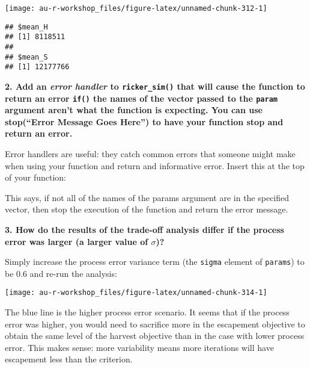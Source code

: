 \documentclass[]{book}
\newenvironment{Shaded}{\begin{snugshade}}{\end{snugshade}}
\newcommand{\KeywordTok}[1]{\textcolor[rgb]{0.13,0.29,0.53}{\textbf{#1}}}
\newcommand{\StringTok}[1]{\textcolor[rgb]{0.31,0.60,0.02}{#1}}
\newcommand{\ControlFlowTok}[1]{\textcolor[rgb]{0.13,0.29,0.53}{\textbf{#1}}}
\newcommand{\OperatorTok}[1]{\textcolor[rgb]{0.81,0.36,0.00}{\textbf{#1}}}
\newcommand{\NormalTok}[1]{#1}
\theoremstyle{definition}
\theoremstyle{definition}
\theoremstyle{definition}
\theoremstyle{remark}
\begin{document}
\begin{center}\texttt{[image: au-r-workshop\_files/figure-latex/unnamed-chunk-312-1]} \end{center}

\begin{verbatim}
## $mean_H
## [1] 8118511
## 
## $mean_S
## [1] 12177766
\end{verbatim}

\textbf{2. Add an \emph{error handler} to \texttt{ricker\_sim()} that
will cause the function to return an error \texttt{if()} the names of
the vector passed to the \texttt{param} argument aren't what the
function is expecting. You can use stop(``Error Message Goes Here'') to
have your function stop and return an error.}

Error handlers are useful: they catch common errors that someone might
make when using your function and return and informative error. Insert
this at the top of your function:

\begin{Shaded}
\end{Shaded}

This says, if not all of the names of the params argument are in the
specified vector, then stop the execution of the function and return the
error message.

\textbf{3. How do the results of the trade-off analysis differ if the
process error was larger (a larger value of \(\sigma\))?}

Simply increase the process error variance term (the \texttt{sigma}
element of \texttt{params}) to be 0.6 and re-run the analysis:

\begin{center}\texttt{[image: au-r-workshop\_files/figure-latex/unnamed-chunk-314-1]} \end{center}

The blue line is the higher process error scenario. It seems that if the
process error was higher, you would need to sacrifice more in the
escapement objective to obtain the same level of the harvest objective
than in the case with lower process error. This makes sense: more
variability means more iterations will have escapement less than the
criterion.
\end{document}
